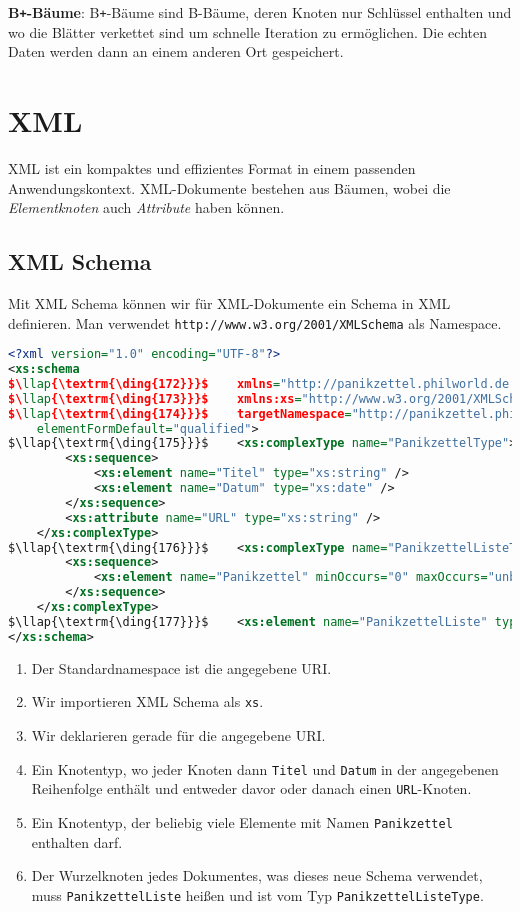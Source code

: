 \documentclass[a4paper,parskip=half*,DIV=15,fontsize=11pt]{scrartcl}
\begin{document}
\textbf{B\texttt{+}-Bäume}: B\texttt{+}-Bäume sind B-Bäume, deren Knoten nur Schlüssel enthalten und wo die Blätter verkettet sind um schnelle Iteration zu ermöglichen. Die echten Daten werden dann an einem anderen Ort gespeichert.

\section{XML}

XML ist ein kompaktes und effizientes Format in einem passenden Anwendungskontext. XML-Dokumente bestehen aus Bäumen, wobei die \emph{Elementknoten} auch \emph{Attribute} haben können.

\subsection{XML Schema}

Mit XML Schema können wir für XML-Dokumente ein Schema in XML definieren. Man verwendet \lstinline{http://www.w3.org/2001/XMLSchema} als Namespace.

\begin{lstlisting}[language=XML,mathescape]
<?xml version="1.0" encoding="UTF-8"?>
<xs:schema
$\llap{\textrm{\ding{172}}}$    xmlns="http://panikzettel.philworld.de.de/Panikzettel"
$\llap{\textrm{\ding{173}}}$    xmlns:xs="http://www.w3.org/2001/XMLSchema"
$\llap{\textrm{\ding{174}}}$    targetNamespace="http://panikzettel.philworld.de.de/Panikzettel"
    elementFormDefault="qualified">
$\llap{\textrm{\ding{175}}}$    <xs:complexType name="PanikzettelType">
        <xs:sequence>
            <xs:element name="Titel" type="xs:string" />
            <xs:element name="Datum" type="xs:date" />
        </xs:sequence>
        <xs:attribute name="URL" type="xs:string" />
    </xs:complexType>
$\llap{\textrm{\ding{176}}}$    <xs:complexType name="PanikzettelListeType">
        <xs:sequence>
            <xs:element name="Panikzettel" minOccurs="0" maxOccurs="unbounded" />
        </xs:sequence>
    </xs:complexType>
$\llap{\textrm{\ding{177}}}$    <xs:element name="PanikzettelListe" type="PanikzettelListeType"/>
</xs:schema>
\end{lstlisting}

\begin{enumerate}
  \item Der Standardnamespace ist die angegebene URI.
  \item Wir importieren XML Schema als \lstinline{xs}.
  \item Wir deklarieren gerade für die angegebene URI.
  \item Ein Knotentyp, wo jeder Knoten dann \lstinline{Titel} und \lstinline{Datum} in der angegebenen Reihenfolge enthält und entweder davor oder danach einen \lstinline{URL}-Knoten.
  \item Ein Knotentyp, der beliebig viele Elemente mit Namen \lstinline{Panikzettel} enthalten darf.
  \item Der Wurzelknoten jedes Dokumentes, was dieses neue Schema verwendet, muss \lstinline{PanikzettelListe} heißen und ist vom Typ \lstinline{PanikzettelListeType}.
\end{enumerate}
\end{document}
